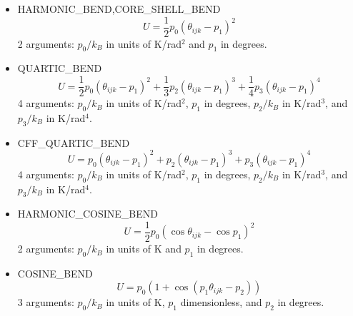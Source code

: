 \begin{itemize}

  \item{HARMONIC\_BEND,CORE\_SHELL\_BEND}\\
  \begin{equation}
  U=\frac{1}{2}p_0\left(\theta_{ijk}-p_1\right)^2
  \end{equation}
  2 arguments: $p_0/k_B$ in units of K/rad$^2$ and $p_1$ in degrees.

  \item{QUARTIC\_BEND}
  \begin{equation}
  U=\frac{1}{2} p_0 \left(\theta_{ijk}-p_1\right)^2+
     \frac{1}{3} p_2 \left(\theta_{ijk}-p_1\right)^3+
     \frac{1}{4} p_3 \left(\theta_{ijk}-p_1\right)^4
  \end{equation}
  4 arguments: $p_0/k_B$ in units of K/rad$^2$, $p_1$ in degrees, $p_2/k_B$ in K/rad$^3$, and $p_3/k_B$ in K/rad$^4$.

  \item{CFF\_QUARTIC\_BEND}
  \begin{equation}
  U=p_0 \left(\theta_{ijk}-p_1\right)^2+
    p_2 \left(\theta_{ijk}-p_1\right)^3+
    p_3 \left(\theta_{ijk}-p_1\right)^4
  \end{equation}
  4 arguments: $p_0/k_B$ in units of K/rad$^2$, $p_1$ in degrees, $p_2/k_B$ in K/rad$^3$, and $p_3/k_B$ in K/rad$^4$.

  \item{HARMONIC\_COSINE\_BEND}\\
  \begin{equation}
  U=\frac{1}{2}p_0\left(\cos\theta_{ijk}-\cos p_1\right)^2
  \end{equation}
  2 arguments: $p_0/k_B$ in units of K and $p_1$ in degrees.

  \item{COSINE\_BEND}\\
  \begin{equation}
  U=p_0\left(1+\cos\left(p_1\theta_{ijk}-p_2\right)\right)
  \end{equation}
  3 arguments: $p_0/k_B$ in units of K, $p_1$ dimensionless, and $p_2$ in degrees.


\end{itemize}
